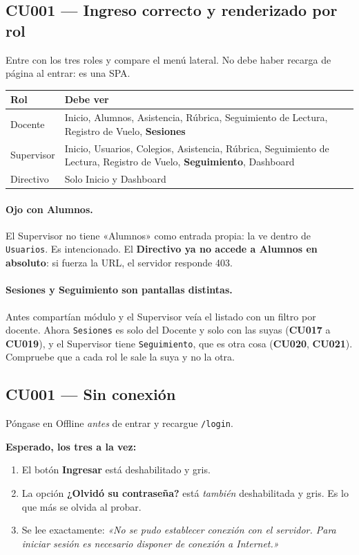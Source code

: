 \documentclass[11pt,a4paper]{article}
\newcommand{\ruta}[1]{\textcolor{azulmarino}{\texttt{#1}}}
\newcommand{\cu}[1]{\textbf{CU#1}}
\begin{document}
\subsection{CU001 --- Ingreso correcto y renderizado por rol}

Entre con los tres roles y compare el menú lateral. No debe haber recarga de
página al entrar: es una SPA.

\begin{center}
\begin{tabularx}{\textwidth}{lX}
\toprule
\textbf{Rol} & \textbf{Debe ver} \\
\midrule
Docente    & Inicio, Alumnos, Asistencia, Rúbrica, Seguimiento de Lectura, Registro de Vuelo, \textbf{Sesiones} \\
Supervisor & Inicio, Usuarios, Colegios, Asistencia, Rúbrica, Seguimiento de Lectura, Registro de Vuelo, \textbf{Seguimiento}, Dashboard \\
Directivo  & Solo Inicio y Dashboard \\
\bottomrule
\end{tabularx}
\end{center}

\paragraph{Ojo con Alumnos.} El Supervisor no tiene «Alumnos» como entrada
propia: la ve dentro de \ruta{Usuarios}. Es intencionado. El \textbf{Directivo
ya no accede a Alumnos en absoluto}: si fuerza la URL, el servidor responde 403.

\paragraph{Sesiones y Seguimiento son pantallas distintas.} Antes compartían
módulo y el Supervisor veía el listado con un filtro por docente. Ahora
\ruta{Sesiones} es solo del Docente y solo con las suyas (\cu{017} a
\cu{019}), y el Supervisor tiene \ruta{Seguimiento}, que es otra cosa
(\cu{020}, \cu{021}). Compruebe que a cada rol le sale la suya y no la otra.

\subsection{CU001 --- Sin conexión}

Póngase en Offline \emph{antes} de entrar y recargue \ruta{/login}.

\textbf{Esperado, los tres a la vez:}
\begin{enumerate}
  \item El botón \textbf{Ingresar} está deshabilitado y gris.
  \item La opción \textbf{¿Olvidó su contraseña?} está \emph{también}
        deshabilitada y gris. Es lo que más se olvida al probar.
  \item Se lee exactamente: \emph{«No se pudo establecer conexión con el
        servidor. Para iniciar sesión es necesario disponer de conexión a
        Internet.»}
\end{enumerate}
\end{document}
